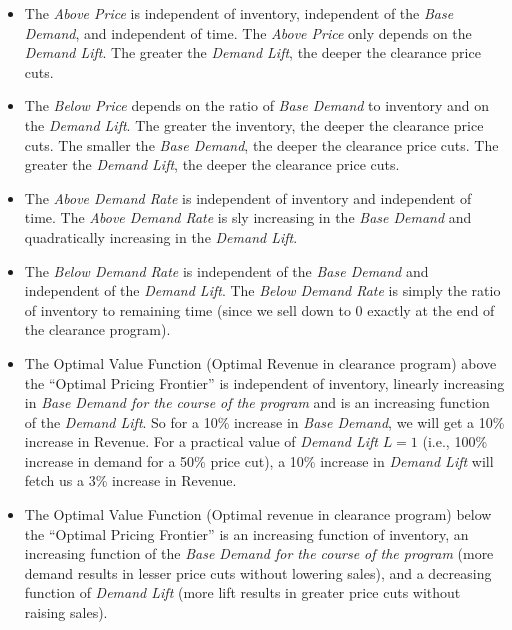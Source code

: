\documentclass[12pt]{amsart}
\begin{document}
\begin{itemize}
\item The {\em Above Price} is independent of inventory, independent of the {\em Base Demand}, and independent of time. The {\em Above Price} only depends on the {\em Demand Lift}. The greater the {\em Demand Lift}, the deeper the clearance price cuts.
\item The {\em Below Price} depends on the ratio of {\em Base Demand} to inventory and on the {\em Demand Lift}. The greater the inventory, the deeper the clearance price cuts. The smaller the {\em Base Demand}, the deeper the clearance price cuts. The greater the {\em Demand Lift}, the deeper the clearance price cuts.
\item The {\em Above Demand Rate} is independent of inventory and independent of time. The {\em Above Demand Rate} is sly increasing in the {\em Base Demand} and quadratically increasing in the {\em Demand Lift}.
\item The {\em Below Demand Rate} is independent of the {\em Base Demand} and independent of the {\em Demand Lift}. The {\em Below Demand Rate} is simply the ratio of inventory to remaining time (since we sell down to 0 exactly at the end of the clearance program).
\item The Optimal Value Function (Optimal Revenue in clearance program) above the ``Optimal Pricing Frontier'' is independent of inventory, linearly increasing in {\em Base Demand for the course of the program} and is an increasing function of the {\em Demand Lift}. So for a 10\% increase in {\em Base Demand}, we will get a 10\% increase in Revenue. For a practical value of {\em Demand Lift} $L = 1$ (i.e., 100\% increase in demand for a 50\% price cut), a 10\% increase in {\em Demand Lift} will fetch us a 3\% increase in Revenue.
\item The Optimal Value Function (Optimal revenue in clearance program) below the ``Optimal Pricing Frontier'' is an increasing function of inventory, an increasing function of the {\em Base Demand for the course of the program} (more demand results in lesser price cuts without lowering sales), and a decreasing function of {\em Demand Lift} (more lift results in greater price cuts without raising sales).
\end{itemize}
   
     
   
\end{document}
